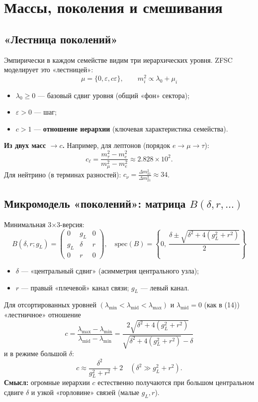 \documentclass[12pt,a4paper]{article}
\begin{document}
\section{Массы, поколения и смешивания}

\subsection{«Лестница поколений»}
Эмпирически в каждом семействе видим три иерархических уровня. ZFSC моделирует это «лестницей»:
\[
\boxed{\mu = \{0, \varepsilon, c \varepsilon \}, \qquad
m_i^2 \propto \lambda_0 + \mu_i} \tag{12}
\]
\begin{itemize}
    \item \(\lambda_0 \ge 0\) — базовый сдвиг уровня (общий «фон» сектора);
    \item \(\varepsilon > 0\) — шаг;
    \item \(c > 1\) — \textbf{отношение иерархии} (ключевая характеристика семейства).
\end{itemize}

\textbf{Из двух масс \(\to c\).}  
Например, для лептонов (порядок \(e \to \mu \to \tau\)):
\[
c_\ell = \frac{m_\tau^2 - m_e^2}{m_\mu^2 - m_e^2} \approx 2.828 \times 10^2. \tag{13}
\]
Для нейтрино (в терминах разностей): \(c_\nu = \frac{\Delta m_{31}^2}{\Delta m_{21}^2} \approx 34\).

\subsection{Микромодель «поколений»: матрица \(B(\delta,r,\dots)\)}
Минимальная 3×3-версия:
\[
\boxed{
B(\delta,r;g_L) = \begin{pmatrix}
0 & g_L & 0 \\
g_L & \delta & r \\
0 & r & 0
\end{pmatrix}, \quad
\mathrm{spec}(B) = \left\{ 0, \ \frac{\delta \pm \sqrt{\delta^2 + 4(g_L^2 + r^2)}}{2} \right\}
} \tag{14}
\]
\begin{itemize}
    \item \(\delta\) — «центральный сдвиг» (асимметрия центрального узла);
    \item \(r\) — правый «плечевой» канал связи; \(g_L\) — левый канал.
\end{itemize}

Для отсортированных уровней \((\lambda_{\min} < \lambda_{\mathrm{mid}} < \lambda_{\max})\) и \(\lambda_{\mathrm{mid}} = 0\) (как в (14)) «лестничное» отношение
\[
\boxed{
c = \frac{\lambda_{\max} - \lambda_{\min}}{\lambda_{\mathrm{mid}} - \lambda_{\min}}
= \frac{2 \sqrt{\delta^2 + 4(g_L^2 + r^2)}}{\sqrt{\delta^2 + 4(g_L^2 + r^2)} - \delta}
} \tag{15}
\]
и в режиме большой \(\delta\):
\[
\boxed{c \approx \frac{\delta^2}{g_L^2 + r^2} + 2} \quad (\delta^2 \gg g_L^2 + r^2). \tag{16}
\]
\textbf{Смысл:} огромные иерархии \(c\) естественно получаются при большом центральном сдвиге \(\delta\) и узкой «горловине» связей (малые \(g_L, r\)).
\end{document}
